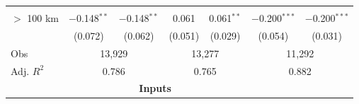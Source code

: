 \documentclass[12pt]{article}
\begin{document}
\begin{appendices}
\begin{table}
\begin{threeparttable}[t]
\begin{tabular}{lcccccc}
              &                &                 &            &             &                 &                    \\
$>$ 100 km    & $-$0.148$^{**}$& $-$0.148$^{**}$ & 0.061      & 0.061$^{**}$& $-$0.200$^{***}$& $-$0.200$^{***}$   \\
              & (0.072)        & (0.062)         & (0.051)    & (0.029)     & (0.054)         & (0.031)            \\
         [1em]
         \hline
         Obs      &   \multicolumn{2}{c}{13,929}  &   \multicolumn{2}{c}{13,277} &   \multicolumn{2}{c}{11,292} \\
         Adj. $R^2$ &  \multicolumn{2}{c}{0.786} &\multicolumn{2}{c}{0.765}      &  \multicolumn{2}{c}{0.882}   \\

\hline\hline
 & \multicolumn{4}{c}{\textbf{Inputs}} & & \\
[.5em]


\end{tabular}
\end{threeparttable}
\end{table}
\end{appendices}
\end{document}
